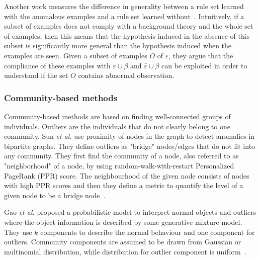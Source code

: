 Another work measures the difference in generality between a rule set learned with the anomalous examples and a rule set learned without~\cite{Angiulli2009}. Intuitively, if a subset of examples does not comply with a background theory and the whole set of examples, then this means that the hypothesis induced in the absence of this subset is significantly more general than the hypothesis induced when the examples are seen. Given a subset of examples $O$ of $\varepsilon$, they argue that the compliance of these examples with $\varepsilon\cup \beta$ and  $\bar{\varepsilon}\cup \beta$ can be exploited in order to understand if the set $O$ contains abnormal observation.

\subsubsection{Community-based methods}
Community-based methods are based on finding well-connected groups of individuals. Outliers are the individuals that do not clearly belong to one community.
 Sun {\em et al.} use proximity of nodes in the graph to detect anomalies in bipartite graphs. They define outliers as "bridge" nodes/edges that do not fit into any community.  They first find the community of a node, also referred to as "neighborhood" of  a node, by using random-walk-with-restart Personalized PageRank (PPR) score. The neighbourhood of the given node consists of nodes with high PPR scores and then they define a metric to quantify the level of a given node to be a bridge node~\cite{Sun2005}.
 
 Gao {\em et al.} proposed a probabilistic model to interpret normal objects and outliers where the object information is described by some generative mixture model. They use $k$ components to describe the normal behaviour and one component for outliers. Community components are assumed to be drawn from Gaussian or multinomial distribution, while distribution for outlier component is uniform~\cite{Gao2010}. 
 
